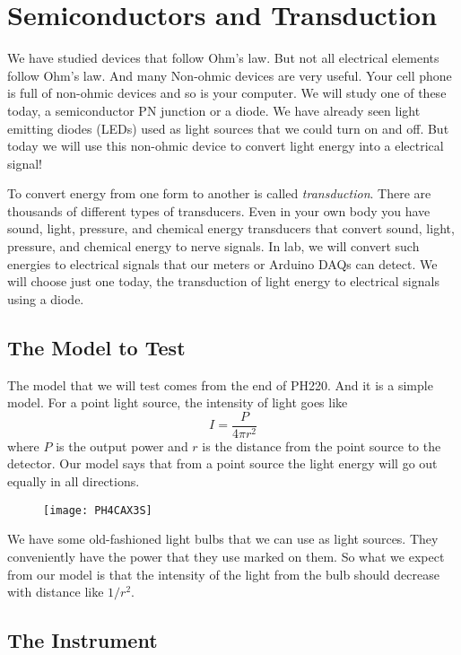 \chapter{Semiconductors and Transduction}
We have studied devices that follow Ohm's law. But not all electrical
elements follow Ohm's law. And many Non-ohmic devices are very useful. Your
cell phone is full of non-ohmic devices and so is your computer. We will
study one of these today, a semiconductor PN junction or a diode. We have
already seen light emitting diodes (LEDs) used as light sources that we
could turn on and off. But today we will use this non-ohmic device to
convert light energy into a electrical signal!

To convert energy from one form to another is called \emph{transduction}.
There are thousands of different types of transducers. Even in your own body
you have sound, light, pressure, and chemical energy transducers that
convert sound, light, pressure, and chemical energy to nerve signals. In
lab, we will convert such energies to electrical signals that our meters or
Arduino DAQs can detect. We will choose just one today, the transduction of
light energy to electrical signals using a diode.

\section{The Model to Test}

The model that we will test comes from the end of PH220. And it is a simple
model. For a point light source, the intensity of light goes like 
\begin{equation*}
I=\frac{P}{4\pi r^{2}}
\end{equation*}%
where $P$ is the output power and $r$ is the distance from the point source
to the detector. Our model says that from a point source the light energy
will go out equally in all directions. \begin{figure}[h!]
\texttt{[image: PH4CAX3S]}
\end{figure}

We have some old-fashioned light bulbs that we can use as light sources.
They conveniently have the power that they use marked on them. So what we
expect from our model is that the intensity of the light from the bulb
should decrease with distance like $1/r^{2}.$

\section{The Instrument}

